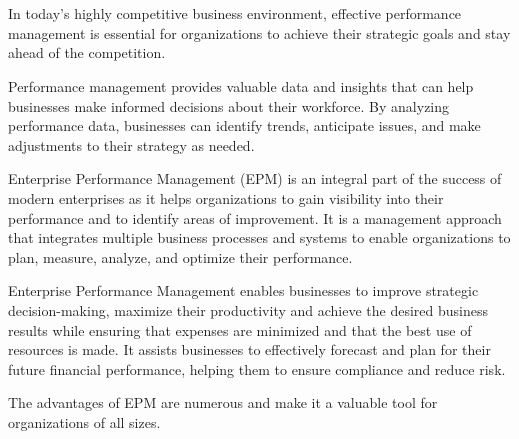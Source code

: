 \documentclass[12pt,a4paper,openright,twoside]{book}
\begin{document}
\tableofcontents   

\mainmatter

\chapter{\introductionname}
\label{chap:introduction}


In today's highly competitive business environment, effective performance management is essential for organizations to achieve their strategic goals and stay ahead of the competition.

Performance management provides valuable data and insights that can help businesses make informed decisions about their workforce. 
%
By analyzing performance data, businesses can identify trends, anticipate issues, and make adjustments to their strategy as needed.

Enterprise Performance Management (EPM) is an integral part of the success of modern enterprises as it helps organizations to gain visibility into their performance and to identify areas of improvement.
%
It is a management approach that integrates multiple business processes and systems to enable organizations to plan, measure, analyze, and optimize their performance.

 Enterprise Performance Management enables businesses to improve strategic decision-making, maximize their productivity and achieve the desired business results while ensuring that expenses are minimized and that the best use of resources is made.
 It assists businesses to effectively forecast and plan for their future financial performance, helping them to ensure compliance and reduce risk. 
 
 The advantages of EPM are numerous and make it a valuable tool for organizations of all sizes.
\end{document}
